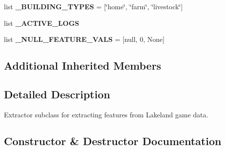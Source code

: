 \begin{DoxyCompactItemize}
\item 
\mbox{\label{classfeature__extractors_1_1_lakeland_extractor_1_1_lakeland_extractor_a51cd38e519d3f386dbdc82afd50d64cb}} 
list {\bfseries \+\_\+\+B\+U\+I\+L\+D\+I\+N\+G\+\_\+\+T\+Y\+P\+ES} = \mbox{[}\char`\"{}home\char`\"{}, \char`\"{}farm\char`\"{}, \char`\"{}livestock\char`\"{}\mbox{]}
\item 
list {\bfseries \+\_\+\+A\+C\+T\+I\+V\+E\+\_\+\+L\+O\+GS}
\item 
\mbox{\label{classfeature__extractors_1_1_lakeland_extractor_1_1_lakeland_extractor_a42ea6adaef6f31d7441d6e88b622fe3b}} 
list {\bfseries \+\_\+\+N\+U\+L\+L\+\_\+\+F\+E\+A\+T\+U\+R\+E\+\_\+\+V\+A\+LS} = \mbox{[}\textquotesingle{}null\textquotesingle{}, 0, None\mbox{]}
\end{DoxyCompactItemize}
\subsection*{Additional Inherited Members}


\subsection{Detailed Description}
Extractor subclass for extracting features from Lakeland game data. 



\subsection{Constructor \& Destructor Documentation}
\mbox{\label{classfeature__extractors_1_1_lakeland_extractor_1_1_lakeland_extractor_a37d5fb9484dbf1a2c841828f0348cf1e}} 

